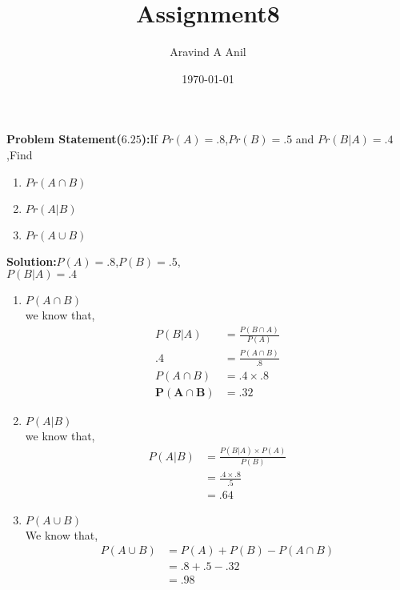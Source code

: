 \documentclass[11pt,a4paper,twocolumn]{article}
\title{Assignment8}
\author{Aravind A Anil}
\date{\today}
\begin{document}
\maketitle
\begin{flushleft}
\textbf{Problem Statement($6.25$):}If $Pr(A)=.8$,$Pr(B)=.5$ and $Pr(B|A)=.4$,Find
\end{flushleft}
\begin{enumerate}[i]
    \item $Pr(A\cap B)$
    \item$Pr(A|B)$
    \item$Pr(A\cup B)$\\[5pt]
\end{enumerate}
\textbf{Solution:}$P(A)=.8$,$P(B)=.5$,\\$P(B|A)=.4$
\begin{enumerate}
    \item{$P(A\cap B)$}\\
we know that,
\begin{align*}
P(B|A)&=\frac{P(B\cap A)}{P(A)}\\
.4&=\frac{P(A\cap B)}{.8}\\
P(A\cap B)&=.4\times.8\\
\mathbf{P(A\cap B)}&=.32
\end{align*}
   \item{$P(A|B)$}\\
we know that,
\begin{align*}
    P(A|B)&=\frac{P(B|A)\times P(A)}{P(B)}\\
    &=\frac{.4\times.8}{.5}\\
    &=.64
\end{align*}
   \item{$P(A \cup B)$}\\
We know that,
\begin{align*}
    P(A\cup B)&=P(A)+P(B)-P(A\cap B)\\
    &=.8+.5-.32\\
    &=.98
\end{align*}
\end{enumerate}
\end{document}
